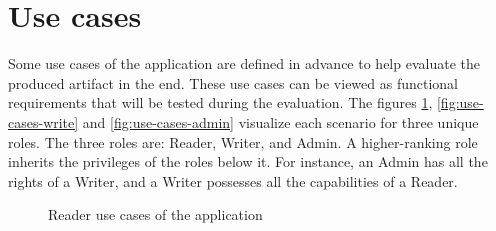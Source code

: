 \newpage

\section{Use cases}

Some use cases of the application are defined in advance to help evaluate the produced artifact in the end. These use cases can be viewed as functional requirements that will be tested during the evaluation. The figures \ref{fig:use-cases-reader}, \ref{fig:use-cases-write} and \ref{fig:use-cases-admin} visualize each scenario for three unique roles. The three roles are: Reader, Writer, and Admin. A higher-ranking role inherits the privileges of the roles below it. For instance, an Admin has all the rights of a Writer, and a Writer possesses all the capabilities of a Reader.

\begin{figure}[!h]
    \centering
    \caption{Reader use cases of the application}
    \label{fig:use-cases-reader}
\end{figure}


